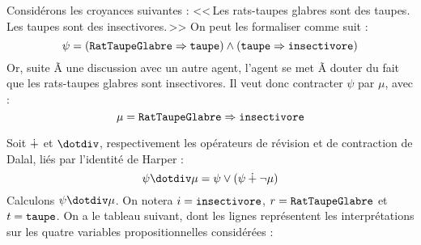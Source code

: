 \documentclass[11pt, a4paper]{article}
\def\fm#1{\text{\texttt{#1}}}
\def\limplique{\Rightarrow}
\begin{document}
	Considérons les croyances suivantes :
	<<\,Les rats-taupes glabres sont des taupes.
	Les taupes sont des insectivores.\,>>
	On peut les formaliser comme suit :
	\begin{equation*}
	\psi = (\RTG \limplique \fm{taupe})
	\land (\fm{taupe} \limplique \fm{insectivore})
	\end{equation*}
	Or, suite Ã  une discussion avec un autre agent,
	l'agent se met Ã  douter du fait que les rats-taupes glabres
	sont insectivores.
	Il veut donc contracter $\psi$ par $\mu$, avec :
	\begin{equation*}
	\mu = \RTG \limplique \fm{insectivore}
	\end{equation*}
	
	Soit $\dotplus$ et $\contraction$, respectivement les opérateurs
	de révision et de contraction de Dalal, liés par l'identité de Harper :
	\begin{equation*}
	\psi \contraction \mu = \psi \lor (\psi \rev \lnot\mu)
	\end{equation*}
	Calculons $\psi\contraction\mu$.
	On notera $i=\fm{insectivore}$, $r=\RTG$
	et $t=\fm{taupe}$.
	On a le tableau suivant, dont les lignes représentent les interprétations
	sur les quatre variables propositionnelles considérées :
\end{document}
